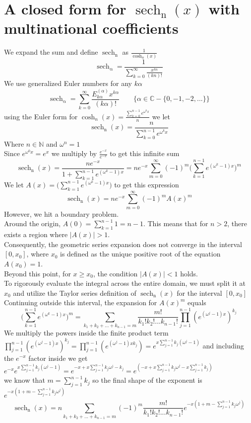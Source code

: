 \documentclass{article}
\DeclareMathOperator{\sech}{sech}
\newcommand{\NotDefinedcosh}[2]{\operatorname{cosh}_{#1}\text{#2}}
\newcommand{\NotDefinedsech}[2]{\operatorname{\sech_{#1}\text{#2}}}
\begin{document}
\section{A closed form for $\NotDefinedsech{n}{}(x)$ with multinational coefficients}
We expand the sum and define $\NotDefinedsech{n}{}$ as $\frac{1}{\NotDefinedcosh{n}{}(x)}$ 
\[\NotDefinedsech{\alpha}{} =\frac{1}{\sum_{k=0}^{\infty}{\frac{x^{kn}}{(kn)!}}}\]
We use generalized Euler numbers for any $k\alpha$
\[\NotDefinedsech{\alpha}{} = \sum_{k=0}^{\infty}{\frac{E^{(\alpha)}_{k\alpha}x^{k\alpha}}{(k\alpha)!}} \qquad \{\alpha\in\mathbb{C}-\{0,-1,-2,...\}\}\]
using the Euler form for $\NotDefinedcosh{n}{}(x) = \frac{\sum_{k=0}^{n-1}e^{\omega^kx}}{n}$ we let 
\[\NotDefinedsech{n}{}(x) = \frac{n}{\sum_{k=0}^{n-1}e^{\omega^kx}}\]
Where $n\in \mathbb{N}$ and $\omega^n=1$\\
Since $e^{\omega^0 x} = e^x$ we multiply by $\frac{e^{-x}}{e^{-x}}$ to get this infinite sum
\[\NotDefinedsech{n}{}(x) = \frac{ne^{-x}}{1+\sum_{k=1}^{n-1}e^{(\omega^k-1)x}} = ne^{-x}\sum_{m=0}^{\infty}(-1)^m\bigg(\sum_{k=1}^{n-1}e^{(\omega^k-1) x}\bigg)^m\]
We let $A(x) = \big(\sum_{k=1}^{n-1}e^{(\omega^k-1) x}\big)$ to get this expression
\[\NotDefinedsech{n}{}(x)=ne^{-x}\sum_{m=0}^{\infty}(-1)^mA(x)^m\]
However, we hit a boundary problem.\\
Around the origin, $A(0) = \sum_{k=1}^{n-1} 1 = n-1$. This means that for $n > 2$, there exists a region where $|A(x)| > 1$. \\
Consequently, the geometric series expansion does not converge in the interval $[0, x_0]$, where $x_0$ is defined as the unique positive root of the equation $A(x_0) = 1$. \\
Beyond this point, for $x \ge x_0$, the condition $|A(x)| < 1$ holds. \\
To rigorously evaluate the integral across the entire domain, we must split it at $x_0$ and utilize the Taylor series definition of $\NotDefinedsech{n}{}(x)$ for the interval $[0, x_0]$\\
Continuing outside this interval, the expansion for $A(x)^m$ equals
\[\big(\sum_{k=1}^{n-1}e^{(\omega^k-1) x}\big)^m = \sum_{k_1+k_2+...+k_{n-1} = m} \frac{m!}{k_1! k_2! ... k_{n-1}!} \prod_{j=1}^{n-1} (e^{(\omega^j-1) x})^{k_j}\]
We multiply the powers inside the finite product term $\prod_{j=1}^{n-1} (e^{(\omega^j-1) x})^{k_j} =\prod_{j=1}^{n-1} (e^{(\omega^j-1) xk_j})=e^{x\sum_{j=1}^{{n-1}}{k_j(\omega^j-1)}} $ and including the $e^{-x}$ factor inside we get $e^{-x}e^{x\sum_{j=1}^{{n-1}}{k_j(\omega^j-1)}} = e^{-x+x\sum_{j=1}^{{n-1}}{k_j\omega^j-k_j}}=e^{(-x+x\sum_{j=1}^{n-1}k_j\omega^j - x\sum_{j=1}^{n-1}k_j)}$\\
we know that $m=\sum_{j=1}^{n-1}k_j$ so the final shape of the exponent is $e^{-x(1+m-\sum_{j=1}^{n-1}k_j\omega^j)}$
\[\NotDefinedsech{n}{}(x) = n\sum_{k_1+k_2+...+k_{n-1} = m} (-1)^m\frac{m!}{k_1! k_2! ... k_{n-1}!} e^{-x(1+m-\sum_{j=1}^{n-1}k_j\omega^j)}\]
\end{document}

